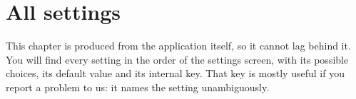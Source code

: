 \chapter{All settings}\label{chap:all-settings}
This chapter is produced from the application itself, so it cannot lag behind it. You will find every setting in
the order of the settings screen, with its possible choices, its default value and its internal key. That key is
mostly useful if you report a problem to us: it names the setting unambiguously.

